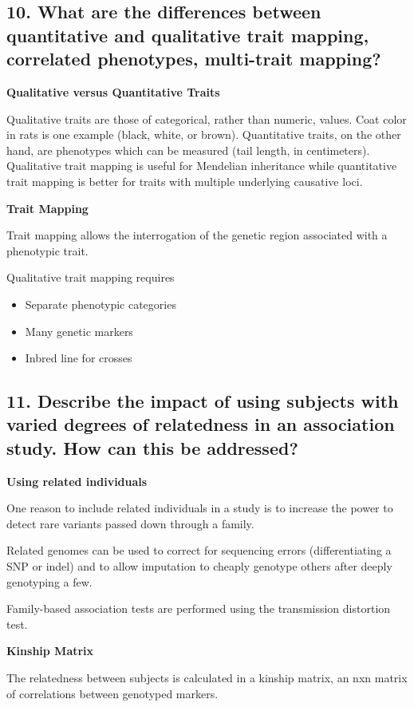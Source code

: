 \documentclass{tufte-handout}
\theoremstyle{noparens}
\begin{document}
\newpage
\subsection{10. What are the differences between quantitative and qualitative trait mapping, correlated phenotypes, multi-trait mapping?}

\textbf{Qualitative versus Quantitative Traits}

Qualitative traits are those of categorical, rather than numeric, values. Coat color in rats is one example (black, white, or brown). Quantitative traits, on the other hand, are phenotypes which can be measured (tail length, in centimeters). Qualitative trait mapping is useful for Mendelian inheritance while quantitative trait mapping is better for traits with multiple underlying causative loci.

\textbf{Trait Mapping}

Trait mapping allows the interrogation of the genetic region associated with a phenotypic trait. 

Qualitative trait mapping requires

\begin{itemize}
\item Separate phenotypic categories
\item Many genetic markers
\item Inbred line for crosses
\end{itemize}

\newpage
\subsection{11. Describe the impact of using subjects with varied degrees of relatedness in an association study. How can this be addressed?}

\noindent
\textbf{Using related individuals}

One reason to include related individuals in a study is to increase the power to detect rare variants passed down through a family. 

Related genomes can be used to correct for sequencing errors (differentiating a SNP or indel) and to allow imputation to cheaply genotype others after deeply genotyping a few.

Family-based association tests are performed using the transmission distortion test. 

\textbf{Kinship Matrix}

The relatedness between subjects is calculated in a kinship matrix, an nxn matrix of correlations between genotyped markers.
\end{document}
